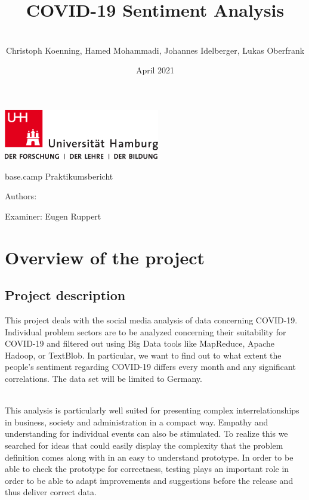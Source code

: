 \documentclass[
    fontsize=12pt,
    headings=small,
    parskip=half,           %
    bibliography=totoc,
    numbers=noenddot,       %
    open=any,               %
    ]{scrreprt}
\title{COVID-19 Sentiment Analysis}
\author{\\ Christoph Koenning, Hamed Mohammadi, Johannes Idelberger, Lukas Oberfrank}
\date{April 2021} %
\begin{document}
\begin{titlepage}
\includegraphics[width=6.8cm]{../pic/up-uhh-logo-u-2010-u-farbe-u-rgb.pdf}
\begin{center}\Large
    \vfill
    \makeatletter
    {\Huge\textsf{\textbf{\@title}}\par}
    \par
    \makeatother
    \bigskip
    base.camp Praktikumsbericht \par
    \bigskip
    \makeatletter
    Authors: {\@author} \par
    \makeatother
    \bigskip
    Examiner: Eugen Ruppert \par
    \bigskip
    \bigskip
    \makeatletter
    {\@date}
    \makeatother
    
    \makeatother
    \vfill
    \vfill
\end{center}
\end{titlepage}





\tableofcontents


\chapter{Overview of the project}


\section{Project description}

This project deals with the social media analysis of data concerning COVID-19. Individual problem sectors are to be analyzed concerning their suitability for COVID-19 and filtered out using Big Data tools like MapReduce, Apache Hadoop, or TextBlob. In particular, we want to find out to what extent the people's sentiment regarding COVID-19 differs every month and any significant correlations. The data set will be limited to Germany.


\\
This analysis is particularly well suited for presenting complex interrelationships in business, society and administration in a compact way. Empathy and understanding for individual events can also be stimulated. To realize this we searched for ideas that could easily display the complexity that the problem definition comes along with in an easy to understand prototype. In order to be able to check the prototype for correctness, testing plays an important role in order to be able to adapt improvements and suggestions before the release and thus deliver correct data.
\end{document}
